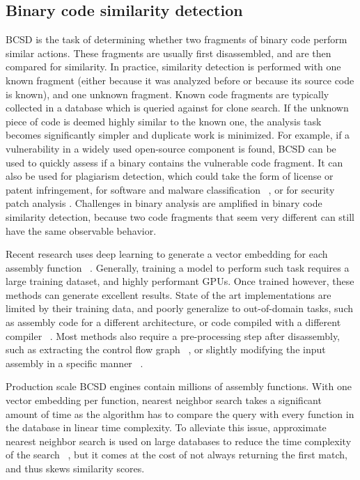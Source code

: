 \subsection{Binary code similarity detection}

BCSD is the task of determining whether two fragments of binary code perform similar actions.
These fragments are usually first disassembled, and are then compared for similarity. In practice,
similarity detection is performed with one known fragment (either because it was analyzed before
or because its source code is known), and one unknown fragment. Known code fragments are typically collected in a
database which is queried against for clone search. If the unknown piece of code is deemed
highly similar to the known one, the analysis task becomes significantly simpler and duplicate work is minimized. For example,
if a vulnerability in a widely used open-source component is found, BCSD can be used to quickly
assess if a binary contains the vulnerable code fragment. It can also be used for plagiarism detection, which
could take the form of license or patent infringement, for software and malware classification ~\cite{op-seq}, or for 
security patch analysis \cite{patch}. Challenges in binary analysis are amplified in binary code similarity detection,
because two code fragments that seem very different can still have the same observable behavior.

Recent research uses deep learning to generate a vector embedding for each assembly function ~\cite{SAFE,PalmTree,OrderMatters,Asm2Vec,CLAP}.
Generally, training a model to perform such task requires a large training dataset, and highly performant GPUs.
Once trained however, these methods can generate excellent results.
State of the art implementations are limited by their training data, and poorly generalize to out-of-domain tasks,
such as assembly code for a different architecture, or code compiled with a different compiler ~\cite{BCSDsurvey,CLAP}.
Most methods also require a pre-processing step after disassembly, such as extracting the control flow graph
~\cite{OrderMatters,Asm2Vec}, or slightly modifying the input assembly in a specific manner ~\cite{PalmTree,CLAP}.

Production scale BCSD engines contain millions of assembly functions. With one vector embedding per function, nearest neighbor
search takes a significant amount of time as the algorithm has to compare the query with every function in the database in linear
time complexity. To alleviate this issue, approximate nearest neighbor search is used on large databases to reduce the time
complexity of the search ~\cite{ANN,ANN-limits}, but it comes at the cost of not always returning the first match, and thus
skews similarity scores.

